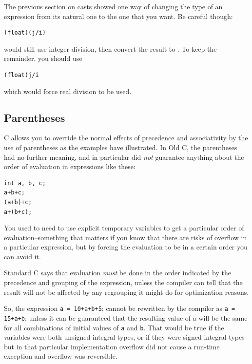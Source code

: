    The previous section on casts showed one way of changing the type of an
    expression from its natural one to the one that you want. Be careful
    though:


   \begin{Verbatim}
(float)(j/i)
\end{Verbatim}

   would still use integer division, then convert the result to
    \float. To keep the remainder, you should use


   \begin{Verbatim}
(float)j/i
\end{Verbatim}

   which would force real division to be used.


  

  \subsection{Parentheses}
   

   C allows you to override the normal effects of precedence and
    associativity by the use of parentheses as the examples have illustrated.
    In Old C, the parentheses had no further meaning, and in particular
    did \textit{not} guarantee anything about the order of evaluation in
    expressions like these:


   \begin{Verbatim}
int a, b, c;
a+b+c;
(a+b)+c;
a+(b+c);
\end{Verbatim}

   You used to need to use explicit temporary variables to get a particular
    order of evaluation--something that matters if you know that there
    are risks of overflow in a particular expression, but by forcing the
    evaluation to be in a certain order you can avoid it.


   Standard C says that evaluation \textit{must} be done in the order
    indicated by the precedence and grouping of the expression, unless the
    compiler can tell that the result will not be affected by any regrouping
    it might do for optimization reasons.


   So, the expression \texttt{a = 10+a+b+5}; cannot be rewritten
    by the compiler as \texttt{a = 15+a+b}; unless it can be
    guaranteed that the resulting value of a will be the same for all
    combinations of initial values of \texttt{a}
    and \texttt{b}. That would be true if the variables were both
    unsigned integral types, or if they were signed integral types but in that
    particular implementation overflow did not cause a run-time exception and
    overflow was reversible.


